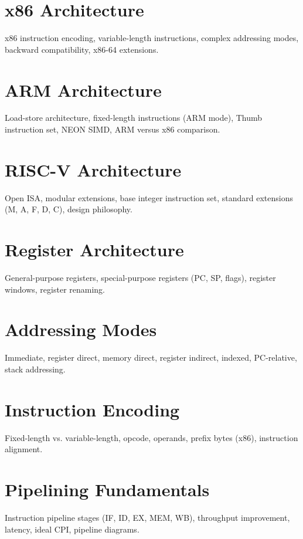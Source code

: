 \chapter{x86 Architecture}
x86 instruction encoding, variable-length instructions, complex addressing modes, backward compatibility, x86-64 extensions.

\chapter{ARM Architecture}
Load-store architecture, fixed-length instructions (ARM mode), Thumb instruction set, NEON SIMD, ARM versus x86 comparison.

\chapter{RISC-V Architecture}
Open ISA, modular extensions, base integer instruction set, standard extensions (M, A, F, D, C), design philosophy.

\chapter{Register Architecture}
General-purpose registers, special-purpose registers (PC, SP, flags), register windows, register renaming.

\chapter{Addressing Modes}
Immediate, register direct, memory direct, register indirect, indexed, PC-relative, stack addressing.

\chapter{Instruction Encoding}
Fixed-length vs. variable-length, opcode, operands, prefix bytes (x86), instruction alignment.


\chapter{Pipelining Fundamentals}
Instruction pipeline stages (IF, ID, EX, MEM, WB), throughput improvement, latency, ideal CPI, pipeline diagrams.

